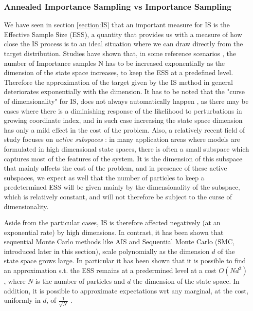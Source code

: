 \documentclass[12pt,mythesisstyle]{report}
\begin{document}
\subsubsection{Annealed Importance Sampling vs Importance Sampling}
We have seen in section \ref{section:IS} that an important measure for IS is the Effective Sample Size (ESS), a quantity that provides us with a measure of how close the IS process is to an ideal situation where we can draw directly from the target distribution. Studies have shown that, in some reference scenarios \cite{IS_cost}, the number of Importance samples N has to be increased exponentially as the dimension of the state space increases, to keep the ESS at a predefined level. Therefore the approximation of the target given by the IS method in general deteriorates exponentially with the dimension. It has to be noted that the "curse of dimensionality" for IS, does not always automatically happen \cite{IS_cost}, as there may be cases where there is a diminishing response of the likelihood to perturbations in growing coordinate index, and in such case increasing the state space dimension has only a mild effect in the cost of the problem. Also, a relatively recent field of study focuses on \textit{active subspaces} \cite{IS_cost}: 
 in many application areas where models are formulated in high dimensional state spaces, there is often a small subspace which captures most of the features of the system. It is the dimension of this subspace that mainly affects the cost of the problem, and in presence of these active subspaces, we expect as well that the number of particles to keep a predetermined ESS will be given mainly by the dimensionality of the subspace, which is relatively constant, and will not therefore be subject to the curse of dimensionality.

Aside from the particular cases, IS is therefore affected negatively (at an exponential rate) by high dimensions. In contrast, it has been shown that \cite{crisan1} \cite{crisan2} sequential Monte Carlo methods like AIS and Sequential Monte Carlo (SMC, introduced later in this section), scale polynomially as the dimension $d$ of the state space grows large. In particular it has been shown \cite{crisan1} \cite{crisan2} that it is possible to find an approximation s.t. the ESS remains at a predermined level at a cost $O(Nd^2)$, where $N$ is the number of particles and $d$ the dimension of the state space. In addition, it is possible to approximate expectations wrt any marginal, at the cost, uniformly in $d$, of $\frac{1}{\sqrt{N}}$ \cite{crisan1} \cite{crisan2}.
\end{document}
